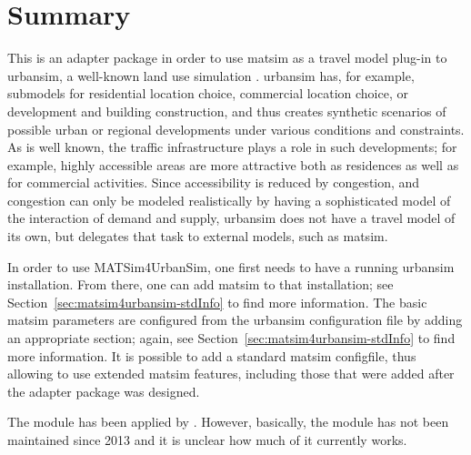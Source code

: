 \section{Summary}
This is an adapter package in order to use \gls{matsim} as a travel model plug-in to \gls{urbansim}, a well-known land use simulation \citep[e.g.][see \url{http://www.urbansim.org}]{WaddellEtc2003UrbanSim}.
\gls{urbansim} has, for example, submodels for residential location choice, commercial location choice, or development and building construction, and thus creates synthetic scenarios of possible urban or regional developments under various conditions and constraints. 
As is well known, the traffic infrastructure plays a role in such developments; for example, highly accessible areas are more attractive both as residences as well as for commercial activities. 
Since accessibility is reduced by congestion, and congestion can only be modeled realistically by having a sophisticated model of the interaction of demand and supply, \gls{urbansim} does not have a travel model of its own, but delegates that task to external models, such as \gls{matsim}.

In order to use MATSim4UrbanSim, one first needs to have a running \gls{urbansim} installation. 
From there, one can add \gls{matsim} to that installation; see Section~\ref{sec:matsim4urbansim-stdInfo} to find more information. 
The basic \gls{matsim} parameters are configured from the \gls{urbansim} configuration file by adding an appropriate section; again, see Section~\ref{sec:matsim4urbansim-stdInfo} to find more information. 
It is possible to add a standard \gls{matsim} \gls{configfile}, thus allowing to use extended \gls{matsim} features, including those that were added after the adapter package was designed.

The module has been applied by \citet[][]{ZoelligRenner_PhDThesis_2014}. 
However, basically, the module has not been maintained since 2013 and it is unclear how much of it currently works.





